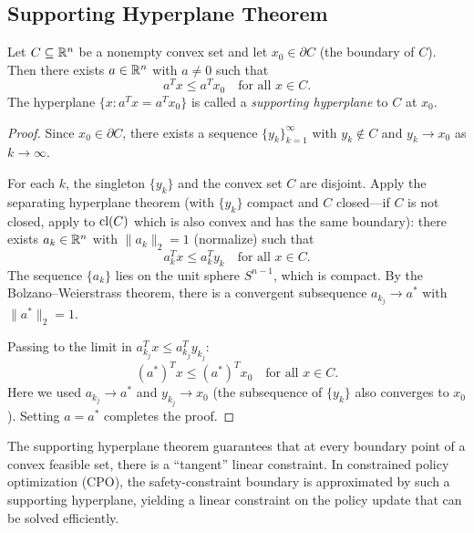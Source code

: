 \documentclass[11pt,a4paper]{article}
\begin{document}
\subsection{Supporting Hyperplane Theorem}

\begin{theorem}
\label{thm:supporting}
Let $C \subseteq \mathbb{R}^n$ be a nonempty convex set and let $x_0 \in \partial C$
(the boundary of $C$).  Then there exists $a \in \mathbb{R}^n$ with $a \ne 0$ such that
\[
  a^T x \le a^T x_0 \quad \text{for all } x \in C.
\]
The hyperplane $\{x : a^T x = a^T x_0\}$ is called a \emph{supporting
hyperplane} to $C$ at $x_0$.
\end{theorem}

\begin{proof}
Since $x_0 \in \partial C$, there exists a sequence $\{y_k\}_{k=1}^\infty$
with $y_k \notin C$ and $y_k \to x_0$ as $k \to \infty$.

For each $k$, the singleton $\{y_k\}$ and the convex set $C$ are disjoint.
Apply the separating hyperplane theorem (with $\{y_k\}$ compact and $C$
closed---if $C$ is not closed, apply to $\operatorname{cl}(C)$ which is also convex and has
the same boundary): there exists $a_k \in \mathbb{R}^n$ with $\|a_k\|_2 = 1$
(normalize) such that
\[
  a_k^T x \le a_k^T y_k \quad \text{for all } x \in C.
\]
The sequence $\{a_k\}$ lies on the unit sphere $S^{n-1}$, which is compact.
By the Bolzano--Weierstrass theorem, there is a convergent subsequence
$a_{k_j} \to a^*$ with $\|a^*\|_2 = 1$.

Passing to the limit in $a_{k_j}^T x \le a_{k_j}^T y_{k_j}$:
\[
  (a^*)^T x \le (a^*)^T x_0 \quad \text{for all } x \in C.
\]
Here we used $a_{k_j} \to a^*$ and $y_{k_j} \to x_0$ (the subsequence of
$\{y_k\}$ also converges to $x_0$).  Setting $a = a^*$ completes the proof.
\end{proof}

\begin{rlconnection}
The supporting hyperplane theorem guarantees that at every boundary point of a
convex feasible set, there is a ``tangent'' linear constraint.  In constrained
policy optimization (CPO), the safety-constraint boundary is approximated by
such a supporting hyperplane, yielding a linear constraint on the policy update
that can be solved efficiently.
\end{rlconnection}

\end{document}
